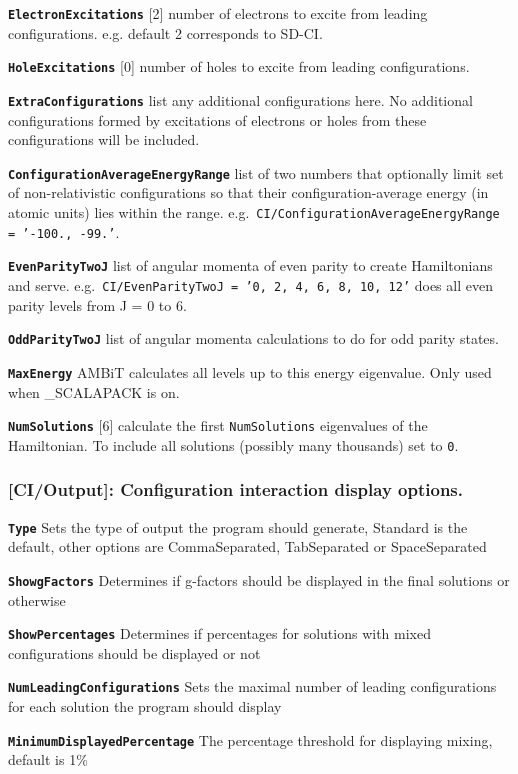 \documentclass[a4paper,11pt]{article}
\newcommand{\option}[1]{\smallskip\noindent\textbf{\texttt{#1}}}
\newcommand{\code}[1]{\texttt{#1}}
\begin{document}
\option{ElectronExcitations} [2] number of electrons to excite from leading configurations. e.g. default 2 corresponds to SD-CI.

\option{HoleExcitations} [0] number of holes to excite from leading configurations.

\option{ExtraConfigurations} list any additional configurations here. No additional configurations formed by excitations of electrons or holes from these configurations will be included.

\option{ConfigurationAverageEnergyRange} list of two numbers that optionally limit set of non-relativistic configurations so that their configuration-average energy (in atomic units) lies within the range. e.g.~\code{CI/ConfigurationAverageEnergyRange = '-100., -99.'}.

\option{EvenParityTwoJ} list of angular momenta of even parity to create Hamiltonians and serve. e.g.~\texttt{CI/EvenParityTwoJ = '0, 2, 4, 6, 8, 10, 12'} does all even parity levels from J = 0 to 6.

\option{OddParityTwoJ} list of angular momenta calculations to do for odd parity states.

\option{MaxEnergy} AMBiT calculates all levels up to this energy eigenvalue. Only used when \_SCALAPACK is on.

\option{NumSolutions} [6] calculate the first \texttt{NumSolutions} eigenvalues of the Hamiltonian. To include all solutions (possibly many thousands) set to \code{0}.

\subsubsection{[CI/Output]: Configuration interaction display options.}

\option{Type} Sets the type of output the program should generate, Standard is the default, other options are CommaSeparated, TabSeparated or SpaceSeparated

\option{ShowgFactors} Determines if g-factors should be displayed in the final solutions or otherwise

\option{ShowPercentages} Determines if percentages for solutions with mixed configurations should be displayed or not

\option{NumLeadingConfigurations} Sets the maximal number of leading configurations for each solution the program should display

\option{MinimumDisplayedPercentage} The percentage threshold for displaying mixing, default is 1\%
\end{document}
